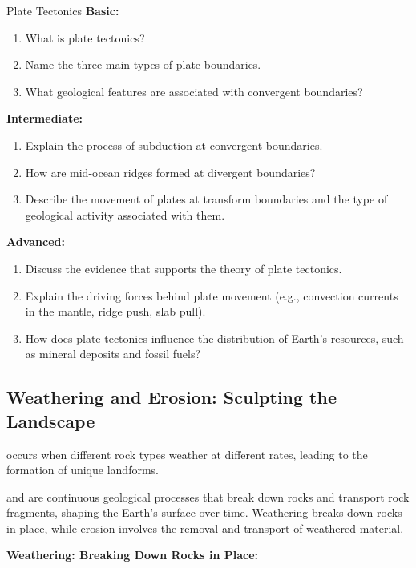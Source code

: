 \begin{tieredquestions}{Plate Tectonics}
\textbf{Basic:}
\begin{enumerate}
    \item What is plate tectonics?
    \item Name the three main types of plate boundaries.
    \item What geological features are associated with convergent boundaries?
\end{enumerate}
\textbf{Intermediate:}
\begin{enumerate}
    \item Explain the process of subduction at convergent boundaries.
    \item How are mid-ocean ridges formed at divergent boundaries?
    \item Describe the movement of plates at transform boundaries and the type of geological activity associated with them.
\end{enumerate}
\textbf{Advanced:}
\begin{enumerate}
    \item Discuss the evidence that supports the theory of plate tectonics.
    \item  Explain the driving forces behind plate movement (e.g., convection currents in the mantle, ridge push, slab pull).
    \item  How does plate tectonics influence the distribution of Earth's resources, such as mineral deposits and fossil fuels?
\end{enumerate}
\end{tieredquestions}

\subsection{Weathering and Erosion: Sculpting the Landscape}

\begin{marginnote}
 occurs when different rock types weather at different rates, leading to the formation of unique landforms.
\end{marginnote}

 and  are continuous geological processes that break down rocks and transport rock fragments, shaping the Earth's surface over time. Weathering breaks down rocks in place, while erosion involves the removal and transport of weathered material.

\textbf{Weathering: Breaking Down Rocks in Place:}

